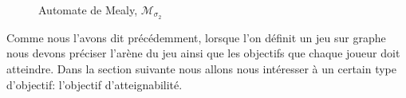 \begin{exemple}
\begin{figure}
\begin{minipage}[c]{.46\linewidth}
			$ $\\
			$ $\\
			$ $\\
			$ $\\
			$ $\\
			
			
			\caption{Automate de Mealy, $\mathcal{M}_{\sigma_2}$}
			\label{ex:automateMealy}
			
	   \end{minipage}
	\end{figure}



	
\end{exemple}

Comme nous l'avons dit précédemment, lorsque l'on définit un jeu sur graphe nous devons préciser l'arène du jeu ainsi que les objectifs que chaque joueur doit atteindre. Dans la section suivante nous allons nous intéresser à un certain type d'objectif: l'objectif d'atteignabilité.
